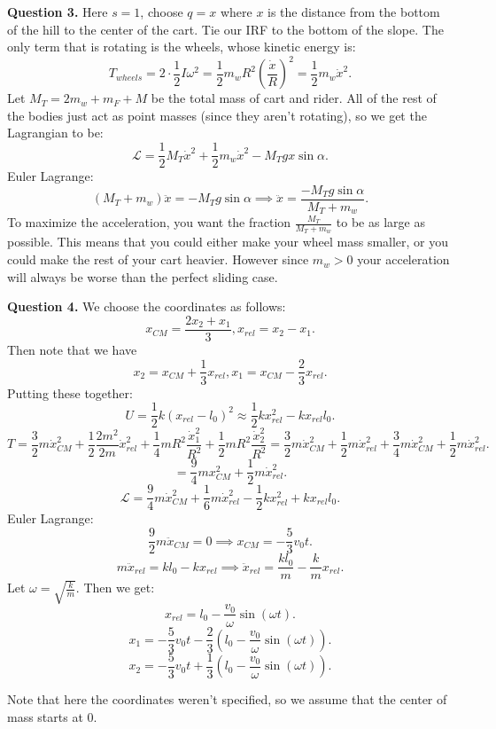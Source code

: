 \documentclass[letterpaper, reqno,11pt]{article}
\begin{document}
{\noindent\bf Question 3.} Here $s=1$, choose $q=x$ where $x$ is the distance from the bottom of the hill to the center of the cart. Tie our IRF to the bottom of the slope. The only term that is rotating is the wheels, whose kinetic energy is: 
\[
T_{wheels}=2\cdot\frac{1}{2}I\omega^2=\frac{1}{2}m_wR^2\left( \frac{\dot x}{R} \right)^2=\frac{1}{2}m_w \dot x^2
.\]
Let $M_T=2m_w+m_F+M$ be the total mass of cart and rider. All of the rest of the bodies just act as point masses (since they aren't rotating), so we get the Lagrangian to be: 
\[
\mathcal L=\frac{1}{2}M_T\dot x^2+\frac{1}{2}m_w\dot x^2-M_T gx\sin\alpha
.\]
Euler Lagrange: 
\[
    \left( M_T+m_w \right) \ddot x=-M_T g\sin\alpha\implies \ddot x=\frac{-M_T g\sin\alpha}{M_T+m_w}
.\]
To maximize the acceleration, you want the fraction $\frac{M_T}{M_T+m_w}$ to be as large as possible. This means that you could either make your wheel mass smaller, or you could make the rest of your cart heavier. However since $m_w> 0$ your acceleration will always be worse than the perfect sliding case. 

{\noindent\bf Question 4.} We choose the coordinates as follows: 
\[
x_{CM}=\frac{2x_2+x_1}{3}, x_{rel}=x_2-x_1
.\]
Then note that we have 
\[
x_2=x_{CM}+\frac{1}{3}x_{rel}, x_1=x_{CM}-\frac{2}{3}x_{rel}
.\]
Putting these together: 
\[
U=\frac{1}{2}k\left( x_{rel}-l_0 \right)^2\approx\frac{1}{2}kx_{rel}^2-kx_{rel}l_0 
.\]
\[
T=\frac{3}{2}m \dot x_{CM}^2+\frac{1}{2}\frac{2m^2}{2m}\dot x_{rel}^2+\frac{1}{4}mR^2 \frac{\dot x_1^2}{R^2}+\frac{1}{2}mR^2 \frac{\dot x_2^2}{R^2}=\frac{3}{2}m\dot x_{CM}^2+\frac{1}{2}m\dot x_{rel}^2+\frac{3}{4}m\dot x_{CM}^2+\frac{1}{2}m\dot x_{rel}^2
.\]
\[
=\frac{9}{4}mx_{CM}^2+\frac{1}{2}m\dot x_{rel}^2
.\]
\[
\mathcal L=\frac{9}{4}m\dot x_{CM}^2+\frac{1}{6}m\dot x_{rel}^2-\frac{1}{2}kx_{rel}^2+kx_{rel}l_0
.\]
Euler Lagrange: 
\[
\frac{9}{2}m\ddot x_{CM}=0\implies x_{CM}=-\frac{5}{3}v_0 t
.\]
\[
m\ddot x_{rel}=kl_0-kx_{rel}\implies \ddot x_{rel}=\frac{kl_0}{m}-\frac{k}{m}x_{rel}
.\]
Let $\omega=\sqrt{\frac{k}{m}} $. Then we get: 
\[
x_{rel}=l_0-\frac{v_0}{\omega}\sin(\omega t)
.\]
\[
x_1=-\frac{5}{3}v_0 t-\frac{2}{3}\left( l_0-\frac{v_0}{\omega}\sin(\omega t) \right) 
.\]
\[
x_2=-\frac{5}{3}v_0 t+\frac{1}{3}\left( l_0-\frac{v_0}{\omega}\sin(\omega t) \right) 
.\]

Note that here the coordinates weren't specified, so we assume that the center of mass starts at $0$. 
\end{document}
